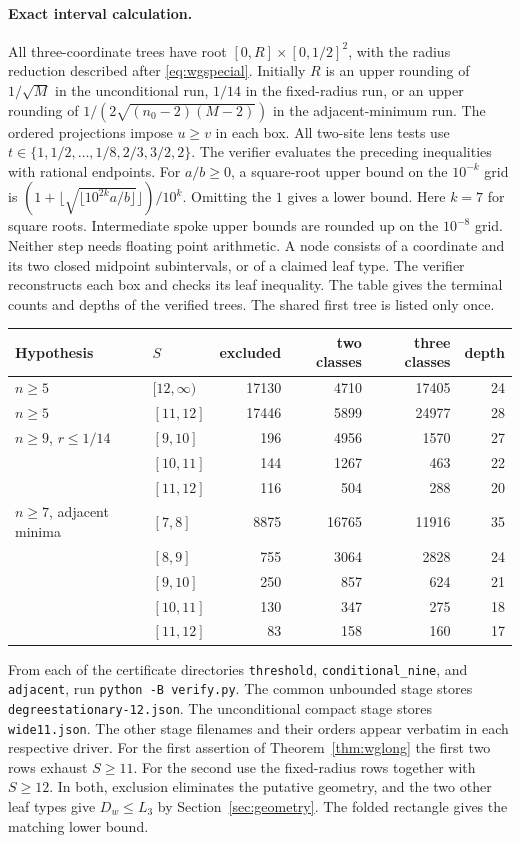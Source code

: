 \documentclass[11pt,a4paper]{article}
\theoremstyle{definition}
\begin{document}
\paragraph{Exact interval calculation.}
All three-coordinate trees have root $[0,R]\times[0,1/2]^2$,
with the radius reduction described after \eqref{eq:wgspecial}.
Initially $R$ is an upper rounding of $1/\sqrt M$ in the
unconditional run, $1/14$ in the fixed-radius run, or an upper
rounding of $1/(2\sqrt{(n_0-2)(M-2)})$ in the adjacent-minimum
run. The ordered projections impose $u\ge v$ in each box. All
two-site lens tests use
$t\in\{1,1/2,\ldots,1/8,2/3,3/2,2\}$. The verifier evaluates
the preceding inequalities with rational endpoints. For $a/b\ge0$,
a square-root upper bound on the $10^{-k}$ grid is
$(1+\lfloor\sqrt{\lfloor10^{2k}a/b\rfloor}\rfloor)/10^k$.
Omitting the $1$ gives a lower bound. Here $k=7$ for square roots.
Intermediate spoke upper bounds are rounded up on the $10^{-8}$
grid. Neither step needs floating point arithmetic.
A node consists of a coordinate and its two closed midpoint
subintervals, or of a claimed leaf type. The verifier reconstructs
each box and checks its leaf inequality. The table gives the terminal counts and depths of the verified trees.
The shared first tree is listed only once.
\begin{center}\small
\begin{tabular}{llrrrr}
Hypothesis & $S$ & excluded & two classes & three classes & depth\\
\hline
$n\ge5$ & $[12,\infty)$ & 17130 & 4710 & 17405 & 24\\
$n\ge5$ & $[11,12]$      & 17446 & 5899 & 24977 & 28\\
$n\ge9$, $r\le1/14$ & $[9,10]$  & 196 & 4956 & 1570 & 27\\
 & $[10,11]$ & 144 & 1267 & 463 & 22\\
 & $[11,12]$ & 116 & 504 & 288 & 20\\
$n\ge7$, adjacent minima & $[7,8]$ & 8875 & 16765 & 11916 & 35\\
 & $[8,9]$  & 755 & 3064 & 2828 & 24\\
 & $[9,10]$ & 250 & 857 & 624 & 21\\
 & $[10,11]$ & 130 & 347 & 275 & 18\\
 & $[11,12]$ & 83 & 158 & 160 & 17
\end{tabular}
\end{center}
From each of the certificate directories \texttt{threshold},
\texttt{conditional\_nine}, and \texttt{adjacent}, run
\texttt{python -B verify.py}. The common unbounded stage stores
\texttt{degreestationary-12.json}. The unconditional compact stage
stores \texttt{wide11.json}. The other stage filenames and their
orders appear verbatim in each respective driver.
For the first assertion of Theorem~\ref{thm:wglong} the first two
rows exhaust $S\ge11$. For the second use the fixed-radius rows
together with $S\ge12$. In both, exclusion eliminates the
putative geometry, and the two other leaf types give $D_w\le L_3$
by Section~\ref{sec:geometry}. The folded rectangle gives the
matching lower bound.
\end{document}
